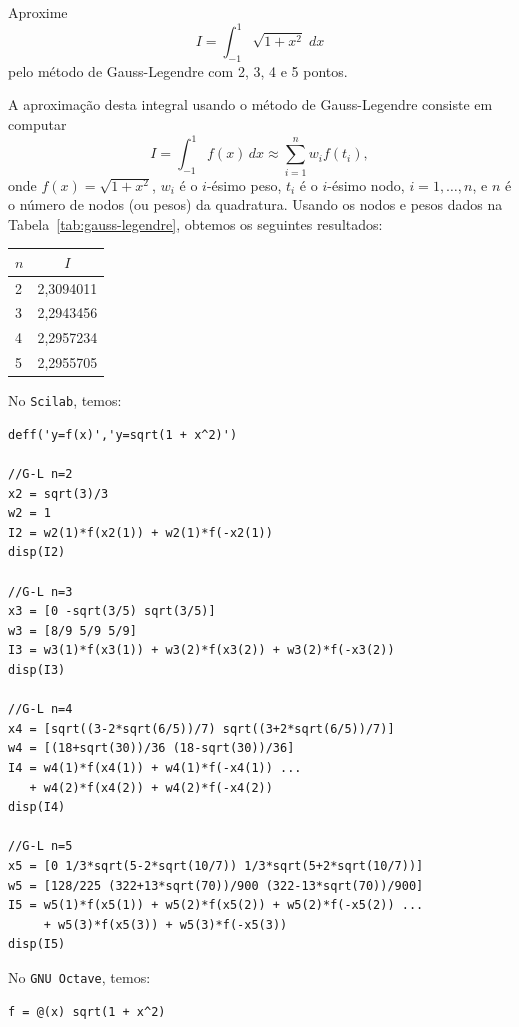 \begin{ex} Aproxime
  \begin{equation}
    I = \int_{-1}^1\sqrt{1+x^2}\;dx
  \end{equation}
pelo método de Gauss-Legendre com 2, 3, 4 e 5 pontos.
\end{ex}
\begin{sol}
  A aproximação desta integral usando o método de Gauss-Legendre consiste em computar
  \begin{equation}
    I = \int_{-1}^1 f(x)\,dx \approx \sum_{i=1}^n w_if(t_i),
  \end{equation}
onde $f(x) = \sqrt{1 + x^2}$, $w_i$ é o $i$-ésimo peso, $t_i$ é o $i$-ésimo nodo, $i=1, \dotsc, n$, e $n$ é o número de nodos (ou pesos) da quadratura. Usando os nodos e pesos dados na Tabela~\ref{tab:gauss-legendre}, obtemos os seguintes resultados:
\begin{center}
  \begin{tabular}{l|c}
    $n$ & $I$ \\\hline
    2 & 2,3094011\\
    3 & 2,2943456\\
    4 & 2,2957234\\
    5 & 2,2955705\\\hline
  \end{tabular}
\end{center}

\ifisscilab
No \verb+Scilab+, temos:
\begin{verbatim}
deff('y=f(x)','y=sqrt(1 + x^2)')

//G-L n=2
x2 = sqrt(3)/3
w2 = 1
I2 = w2(1)*f(x2(1)) + w2(1)*f(-x2(1))
disp(I2)

//G-L n=3
x3 = [0 -sqrt(3/5) sqrt(3/5)]
w3 = [8/9 5/9 5/9]
I3 = w3(1)*f(x3(1)) + w3(2)*f(x3(2)) + w3(2)*f(-x3(2))
disp(I3)

//G-L n=4
x4 = [sqrt((3-2*sqrt(6/5))/7) sqrt((3+2*sqrt(6/5))/7)]
w4 = [(18+sqrt(30))/36 (18-sqrt(30))/36]
I4 = w4(1)*f(x4(1)) + w4(1)*f(-x4(1)) ...
   + w4(2)*f(x4(2)) + w4(2)*f(-x4(2))
disp(I4)

//G-L n=5
x5 = [0 1/3*sqrt(5-2*sqrt(10/7)) 1/3*sqrt(5+2*sqrt(10/7))]
w5 = [128/225 (322+13*sqrt(70))/900 (322-13*sqrt(70))/900]
I5 = w5(1)*f(x5(1)) + w5(2)*f(x5(2)) + w5(2)*f(-x5(2)) ...
     + w5(3)*f(x5(3)) + w5(3)*f(-x5(3))
disp(I5)
\end{verbatim}
\fi
\ifisoctave
No \verb+GNU Octave+, temos:
\begin{verbatim}
f = @(x) sqrt(1 + x^2)


\end{verbatim}
\end{sol}
